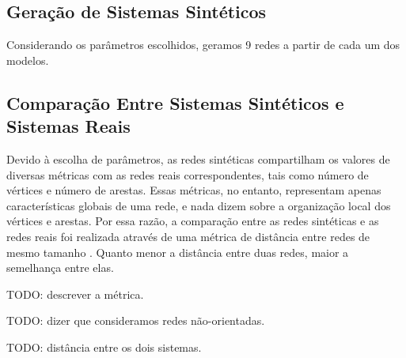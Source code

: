\documentclass{acm_proc_article-sp}
\begin{document}
\subsection{Geração de Sistemas Sintéticos}

Considerando os parâmetros escolhidos, geramos 9 redes a partir de cada um dos modelos.


\subsection{Comparação Entre Sistemas Sintéticos e Sistemas Reais}

Devido à escolha de parâmetros, as redes sintéticas compartilham os valores de diversas métricas com as redes reais correspondentes, tais como número de vértices e número de arestas. Essas métricas, no entanto, representam apenas características globais de uma rede, e nada dizem sobre a organização local dos vértices e arestas. Por essa razão, a comparação entre as redes sintéticas e as redes reais foi realizada através de uma métrica de distância entre redes de mesmo tamanho \cite{Andrade2008}. Quanto menor a distância entre duas redes, maior a semelhança entre elas.

TODO: descrever a métrica.

TODO: dizer que consideramos redes não-orientadas.

TODO: distância entre os dois sistemas.




\end{document}
